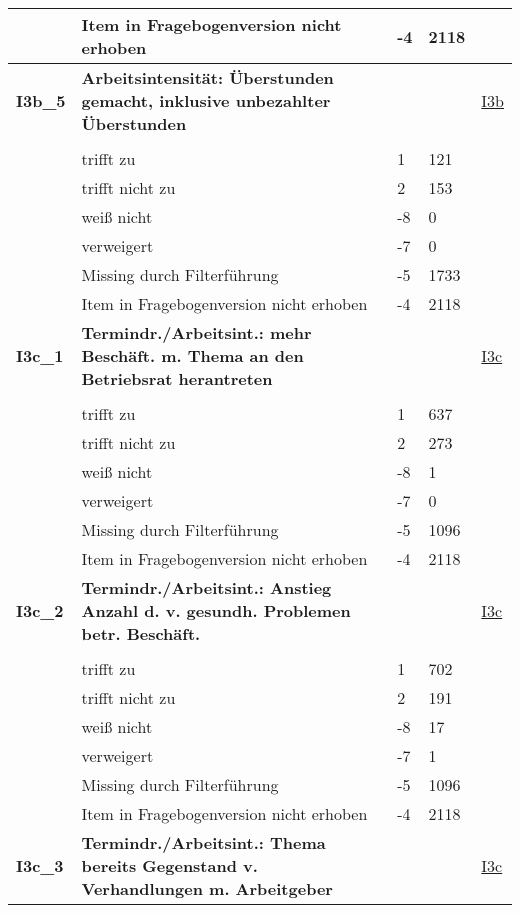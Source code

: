 \begin{longtable}{| L{2.5cm} | L{8.25cm}| C{1.5cm} | R{1.25cm} | C{2.25cm} |  }
   & Item in Fragebogenversion nicht erhoben & -4 & 2118 &  \\ 
   \midrule
\textbf{I3b\_5}\label{var:suf:I3b:5} & \textbf{Arbeitsintensität: Überstunden gemacht, inklusive unbezahlter Überstunden} &  &  & \hyperref[I3b]{I3b} \\ 
   &  &  &  &  \\ 
   & trifft zu & 1 & 121 &  \\ 
   & trifft nicht zu & 2 & 153 &  \\ 
   & weiß nicht & -8 & 0 &  \\ 
   & verweigert & -7 & 0 &  \\ 
   & Missing durch Filterführung & -5 & 1733 &  \\ 
   & Item in Fragebogenversion nicht erhoben & -4 & 2118 &  \\ 
   \midrule
\textbf{I3c\_1}\label{var:suf:I3c:1} & \textbf{Termindr./Arbeitsint.: mehr Beschäft. m. Thema an den Betriebsrat herantreten} &  &  & \hyperref[I3c]{I3c} \\ 
   &  &  &  &  \\ 
   & trifft zu & 1 & 637 &  \\ 
   & trifft nicht zu & 2 & 273 &  \\ 
   & weiß nicht & -8 & 1 &  \\ 
   & verweigert & -7 & 0 &  \\ 
   & Missing durch Filterführung & -5 & 1096 &  \\ 
   & Item in Fragebogenversion nicht erhoben & -4 & 2118 &  \\ 
   \midrule
\textbf{I3c\_2}\label{var:suf:I3c:2} & \textbf{Termindr./Arbeitsint.: Anstieg Anzahl d. v. gesundh. Problemen betr. Beschäft.} &  &  & \hyperref[I3c]{I3c} \\ 
   &  &  &  &  \\ 
   & trifft zu & 1 & 702 &  \\ 
   & trifft nicht zu & 2 & 191 &  \\ 
   & weiß nicht & -8 & 17 &  \\ 
   & verweigert & -7 & 1 &  \\ 
   & Missing durch Filterführung & -5 & 1096 &  \\ 
   & Item in Fragebogenversion nicht erhoben & -4 & 2118 &  \\ 
   \midrule
\textbf{I3c\_3}\label{var:suf:I3c:3} & \textbf{Termindr./Arbeitsint.: Thema bereits Gegenstand v. Verhandlungen m. Arbeitgeber} &  &  & \hyperref[I3c]{I3c} \\ 

\end{longtable}
